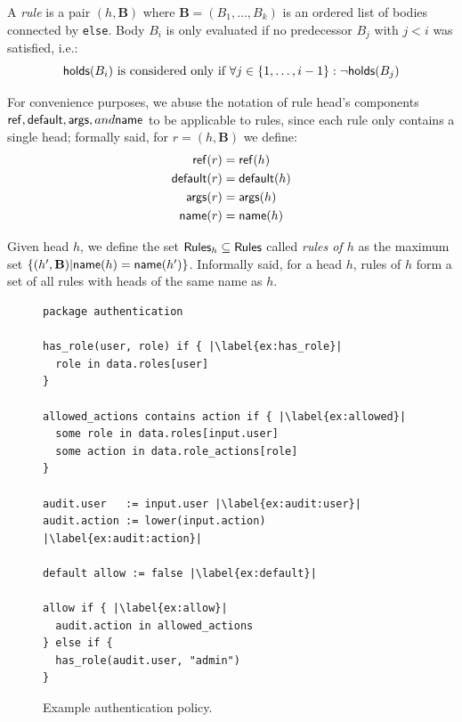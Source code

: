 A \emph{rule} is a pair $(h, \mathbf{B})$ where $\mathbf{B} = (B_1, \ldots, B_k)$ is an ordered list of bodies connected by \texttt{else}.
Body $B_i$ is only evaluated if no predecessor $B_j$ with $j < i$ was satisfied, i.e.:
$$\mathsf{holds}(B_i) \text{ is considered only if } \forall j \in \{1,\ldots,i-1\} : \neg\mathsf{holds}(B_j)$$

For convenience purposes, we abuse the notation of rule head's components $\mathsf{ref},\mathsf{default},\mathsf{args}, and \mathsf{name}$ to be applicable to rules, since each rule only contains a single head; formally said, for $r = (h,\mathbf{B})$ we define:
\begin{align*}
  \mathsf{ref}(r) &= \mathsf{ref}(h) \\
  \mathsf{default}(r) &= \mathsf{default}(h) \\
  \mathsf{args}(r) &= \mathsf{args}(h) \\
  \mathsf{name}(r) &= \mathsf{name}(h)
\end{align*}

Given head $h$, we define the set $\mathsf{Rules}_h \subseteq \mathsf{Rules}$ called \emph{rules of $h$} as the maximum set $\{(h',\mathbf{B})|\mathsf{name}(h) = \mathsf{name}(h')\}$.
Informally said, for a head $h$, rules of $h$ form a set of all rules with heads of the same name as $h$.

\begin{figure}
  \label{fig:ex:auth}
  \begin{lstlisting}[language=Rego,escapechar=|]
package authentication

has_role(user, role) if { |\label{ex:has_role}|
  role in data.roles[user]
}

allowed_actions contains action if { |\label{ex:allowed}|
  some role in data.roles[input.user]
  some action in data.role_actions[role]
}

audit.user   := input.user |\label{ex:audit:user}|
audit.action := lower(input.action) |\label{ex:audit:action}|

default allow := false |\label{ex:default}|

allow if { |\label{ex:allow}|
  audit.action in allowed_actions
} else if {
  has_role(audit.user, "admin")
}
\end{lstlisting}
  \caption{Example \rego authentication policy.}
\end{figure}

